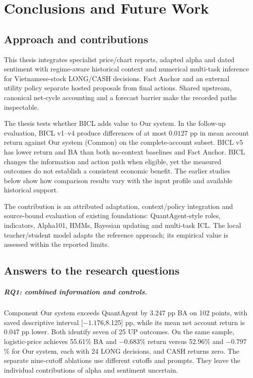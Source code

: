 \chapter{Conclusions and Future Work}\label{s:3929b96346005341}
\section{Approach and contributions}\label{s:fec2d201a3e32bcc}
This thesis integrates specialist price/chart reports, adapted alpha and
dated sentiment with regime-aware historical context and numerical
multi-task inference for Vietnamese-stock LONG/CASH decisions. Fact Anchor
and an external utility policy separate hosted proposals from final
actions. Shared upstream, canonical net-cycle accounting and a forecast
barrier make the recorded paths inspectable.

The thesis tests whether BICL adds value to Our system. In the follow-up
evaluation, BICL v1--v4 produce differences of at most $0.0127$ pp in
mean account return against Our system (Common) on the complete-account
subset. BICL v5 has lower return and BA than both no-context baselines
and Fact Anchor. BICL changes the information and action path when
eligible, yet the measured outcomes do not establish a consistent
economic benefit. The earlier studies below show how comparison results
vary with the input profile and available historical support.

The contribution is an attributed adaptation, context/policy integration
and source-bound evaluation of existing foundations: QuantAgent-style
roles, indicators, Alpha101, HMMs, Bayesian updating and multi-task ICL.
The local teacher/student model adapts the reference approach; its
empirical value is assessed within the reported limits.

\section{Answers to the research questions}\label{s:72579e525074c634}
\paragraph{RQ1: combined information and controls.}
Component Our system exceeds QuantAgent by 3.247 pp BA on 102 points, with saved
descriptive interval [$-1.176$,8.125] pp, while its mean net account
return is 0.047 pp lower. Both identify seven of 25 UP outcomes.
On the same sample, logistic-price achieves 55.61\% BA and $-0.683$\%
return versus 52.96\% and $-0.797$\% for Our system, each with 24 LONG
decisions, and CASH returns zero. The
separate nine-cutoff ablations use different cutoffs and prompts.
They leave the individual contributions of alpha and sentiment uncertain.


